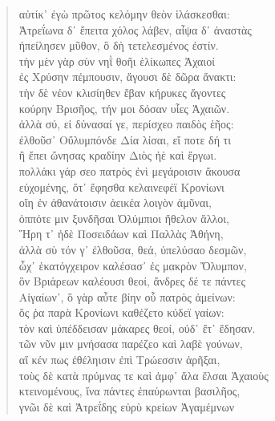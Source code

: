 \begin{Spacing}{1.5}
\begin{verse}
{\large\g αὐτίκ᾽ ἐγὼ πρῶτος κελόμην θεὸν ἱλάσκεσθαι:  } \\
{\large\g Ἀτρεΐωνα δ᾽ ἔπειτα χόλος λάβεν, αἶψα δ᾽ ἀναστὰς  } \\
{\large\g ἠπείλησεν μῦθον, ὃ δὴ τετελεσμένος ἐστίν.  } \\
{\large\g τὴν μὲν γὰρ σὺν νηῒ θοῆι ἑλίκωπες Ἀχαιοί  } \\
{\large\g ἐς Χρύσην πέμπουσιν, ἄγουσι δὲ δῶρα ἄνακτι:  } \\
{\large\g τὴν δὲ νέον κλισίηθεν ἔβαν κήρυκες ἄγοντες  } \\
{\large\g κούρην Βρισῆος, τήν μοι δόσαν υἷες Ἀχαιῶν.  } \\
{\large\g ἀλλὰ σύ, εἰ δύνασαί γε, περίσχεο παιδὸς ἑῆος:  } \\
{\large\g ἐλθοῦσ᾽ Οὔλυμπόνδε Δία λίσαι, εἴ ποτε δή τι  } \\
{\large\g ἢ ἔπει ὤνησας κραδίην Διὸς ἠὲ καὶ ἔργωι.  } \\
{\large\g πολλάκι γάρ σεο πατρὸς ἐνὶ μεγάροισιν ἄκουσα  } \\
{\large\g εὐχομένης, ὅτ᾽ ἔφησθα κελαινεφέϊ Κρονίωνι  } \\
{\large\g οἴη ἐν ἀθανάτοισιν ἀεικέα λοιγὸν ἀμῦναι,  } \\
{\large\g ὁππότε μιν ξυνδῆσαι Ὀλύμπιοι ἤθελον ἄλλοι,  } \\
{\large\g Ἥρη τ᾽ ἠδὲ Ποσειδάων καὶ Παλλὰς Ἀθήνη,  } \\
{\large\g ἀλλὰ σὺ τόν γ᾽ ἐλθοῦσα, θεά, ὑπελύσαο δεσμῶν,  } \\
{\large\g ὦχ᾽ ἑκατόγχειρον καλέσασ᾽ ἐς μακρὸν Ὄλυμπον,  } \\
{\large\g ὃν Βριάρεων καλέουσι θεοί, ἄνδρες δέ τε πάντες  } \\
{\large\g Αἰγαίων᾽, ὃ γὰρ αὖτε βίην οὗ πατρὸς ἀμείνων:  } \\
{\large\g ὅς ῥα παρὰ Κρονίωνι καθέζετο κύδεϊ γαίων:  } \\
{\large\g τὸν καὶ ὑπέδδεισαν μάκαρες θεοί, οὐδ᾽ ἔτ᾽ ἔδησαν.  } \\
{\large\g τῶν νῦν μιν μνήσασα παρέζεο καὶ λαβὲ γούνων,  } \\
{\large\g αἴ κέν πως ἐθέληισιν ἐπὶ Τρώεσσιν ἀρῆξαι,  } \\
{\large\g τοὺς δὲ κατὰ πρύμνας τε καὶ ἀμφ᾽ ἅλα ἔλσαι Ἀχαιοὺς  } \\
{\large\g κτεινομένους, ἵνα πάντες ἐπαύρωνται βασιλῆος,  } \\
{\large\g γνῶι δὲ καὶ Ἀτρεΐδης εὐρὺ κρείων Ἀγαμέμνων  } \\

\end{verse}
\end{Spacing}
